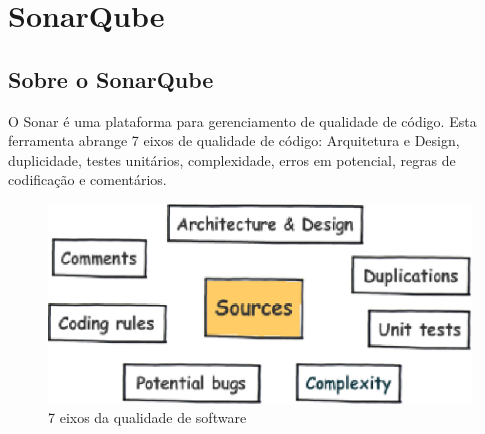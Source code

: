 \chapter{SonarQube}
\label{chap:sonar}

\section{Sobre o SonarQube}

O Sonar é uma plataforma para gerenciamento de qualidade de código. Esta ferramenta abrange 7 eixos de qualidade de código: Arquitetura e Design, duplicidade, testes unitários, complexidade, erros em potencial, regras de codificação e comentários.

\begin{figure}[h!]
\centering
\includegraphics[keepaspectratio=false,scale=0.90]{figuras/figuras_nilton/eixosqualidade.eps}
\caption{7 eixos da qualidade de software 
}
\label{7eixosqualidade}
\end{figure}
